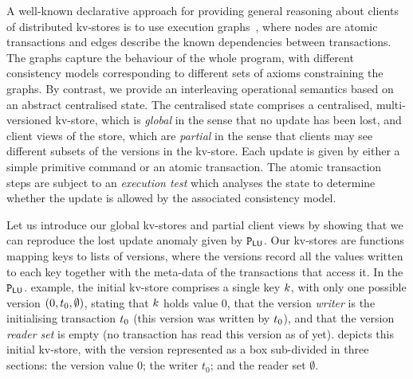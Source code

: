 


A well-known declarative approach for providing general reasoning
about clients of distributed kv-stores is to use  execution 
graphs~\cite{adya-icde,adya,framework-concur,ev_transactions},
where nodes are atomic transactions and edges describe the
known dependencies between transactions. The graphs capture the
behaviour of the whole program, with different consistency models
corresponding to different sets of axioms constraining the graphs. By
contrast, we provide an interleaving operational semantics based on an
abstract centralised state. The centralised state comprises a
centralised, multi-versioned kv-store, which is {\em global} in the
sense that no update has been lost, and client views of the store,
which are {\em partial} in the sense that clients may see different 
subsets of the versions in the kv-store. Each update is given by either
a simple primitive command or an atomic transaction. The atomic
transaction steps are subject to an {\em execution test} which
analyses the state to determine whether the update is allowed by 
the associated  consistency model. 



Let us introduce  our global kv-stores and partial client views by
showing that we can reproduce the lost update anomaly given by 
$\mathtt{P}_{\mathsf{LU}}$. 
Our kv-stores are functions mapping keys to lists of versions, where
the versions  record all the values written to each key together with the
meta-data of the transactions that access it. 
In the $\mathtt{P}_{\mathsf{LU}}$.  example, the initial kv-store comprises a single key $k$, with only one possible 
version $(0, t_{0}, \emptyset)$,  stating that $k$ holds value $0$, 
that the version \emph{writer} is the initialising transaction
$t_0$ (this version was written by $t_0$), 
and that the version \emph{reader set} is empty (no transaction has read this version as of yet). 
 depicts this initial kv-store, with the version
represented as a box sub-divided in three sections: the version value $0$;
the writer $t_0$; and the reader set $\emptyset$. 







